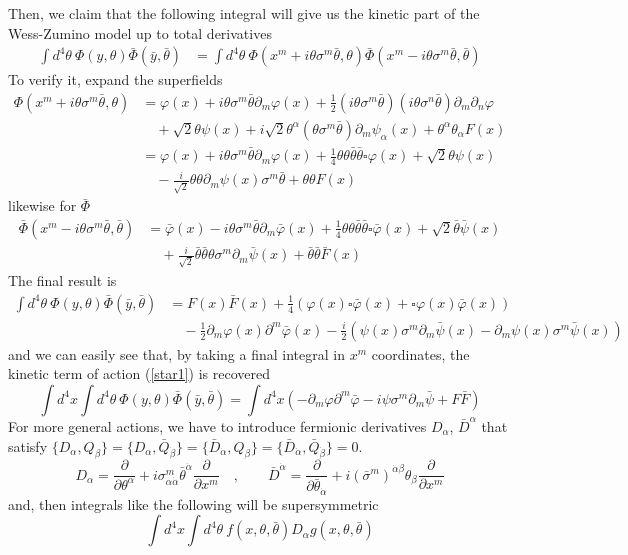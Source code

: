 \documentclass[a4paper,12pt]{article}
\numberwithin{equation}{section}
\numberwithin{exe}{section}
\newcommand{\p}{{\partial}}
\newcommand{\Qb}{{\bar Q}}
\newcommand{\Db}{{\bar D}}
\newcommand{\yb}{{\bar y}}
\newcommand{\Fb}{{\bar F}}
\renewcommand{\a}{{\alpha}}
\newcommand{\ad}{{\dot\alpha}}
\renewcommand{\b}{{\beta}}
\newcommand{\bd}{{\dot\beta}}
\newcommand{\s}{{\sigma}}
\renewcommand{\sb}{{\bar\sigma}}
\renewcommand{\t}{{\theta}}
\newcommand{\tb}{{\bar\theta}}
\newcommand{\vphi}{{\varphi}}
\newcommand{\vphib}{{\bar\varphi}}
\newcommand{\Phib}{{\bar \Phi}}
\newcommand{\psib}{{\bar\psi}}
\begin{document}
Then, we claim that the following integral will give us the kinetic part of the Wess-Zumino model up to total derivatives
	\begin{align}
	\int d^4\t\ \Phi(y,\t) \Phib(\yb,\tb) & = \int d^4\t\ \Phi(x^m + i \t \s^m \tb, \t) \Phib(x^m -i\t \s^m\tb, \tb)
	\end{align}
To verify it, expand the superfields
	\begin{align}
	\Phi(x^m + i\t\s^m \tb, \t) & = \vphi(x) + i\t\s^m \tb \p_m\vphi(x) + \frac12 (i\t\s^m\tb)(i\t\s^n \tb)\p_m\p_n\vphi \nonumber \\
	& \quad + \sqrt2 \t\psi(x) + i\sqrt 2 \t^\a(\t\s^m\tb) \p_m\psi_\a(x) + \t^\a \t_\a F(x) \nonumber \\
	& = \vphi(x) + i\t\s^m\tb \p_m\vphi(x) + \frac14 \t\t \tb\tb \square \vphi(x) + \sqrt2 \t\psi(x) \nonumber \\
	& \quad - \frac{i}{\sqrt2} \t\t \p_m\psi(x)\s^m\tb + \t\t F(x)
	\end{align}
likewise for $\Phib$
	\begin{align}
	\Phib(x^m -i \t\s^m\tb,\tb) & = \vphib(x) - i\t\s^m\tb \p_m\vphib(x) + \frac14 \t\t\tb\tb \square \vphib(x) + \sqrt2 \tb\psib(x) \nonumber \\
	& \quad  + \frac{i}{\sqrt2} \tb\tb\t\s^m\p_m \psib(x) + \tb\tb \Fb(x)
	\end{align}
The final result is
	\begin{align}
	\int d^4 \t\ \Phi(y,\t)\Phib(\yb, \tb) & = F(x) \Fb(x) + \frac14 ( \vphi(x)\square \vphib(x) + \square \vphi(x) \vphib(x) ) \nonumber \\
	& \quad -\frac{1}{2} \p_m\vphi(x) \p^m \vphib(x) - \frac{i}{2} (\psi(x) \s^m \p_m \psib(x) - \p_m\psi(x)\s^m\psib(x))
	\end{align}
and we can easily see that, by taking a final integral in $x^m$ coordinates, the kinetic term of action (\ref{star1}) is recovered
	\begin{equation}
	\int d^4x\int d^4\t\ \Phi(y, \t)\Phib(\yb,\tb) =  \int d^4 x(-\p_m\vphi\p^m\vphib - i \psi\s^m\p_m \psib + F\Fb)
	\end{equation}
For more general actions, we have to introduce fermionic derivatives $D_\a$, $\Db^\a$ that satisfy $\{D_\a, Q_\b\} = \{D_\a, \Qb_\bd\} = \{\Db_\ad, Q_\b\} = \{\Db_\ad, \Qb_\bd\} = 0 $.
	\begin{equation}
	D_\a = \frac{\p}{\p\t^\a} + i\s^m_{\a\ad} \tb^\ad \frac{\p}{\p x^m}\quad, \qquad \Db^\ad = \frac{\p}{\p\tb_\ad} + i(\sb^m)^{\ad\b}\t_\b \frac{\p}{\p x^m}
	\end{equation}
and, then integrals like the following will be supersymmetric
	\begin{equation}
	\int d^4 x\int d^4 \t\ f(x,\t,\tb) D_\a g(x,\t,\tb)
	\end{equation}
\end{document}
